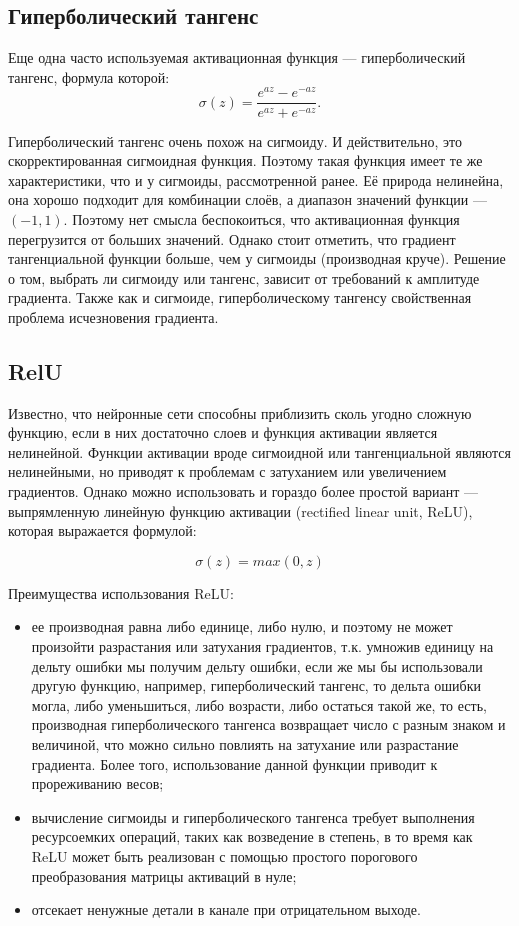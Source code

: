 \documentclass[11pt,colorlinks=true]{article}
\begin{document}
\subsection{Гиперболический тангенс}

Еще одна часто используемая активационная функция — гиперболический тангенс, формула которой:  
\begin{equation*}
\sigma(z) = \frac{e^{az} - e^{-az}}{e^{az} + e^{-az}}.
\end{equation*}

Гиперболический тангенс очень похож на сигмоиду. И действительно, это скорректированная сигмоидная функция. Поэтому такая функция имеет те же характеристики, что и у сигмоиды, рассмотренной ранее. Её природа нелинейна, она хорошо подходит для комбинации слоёв, а диапазон значений функции --- $(-1, 1)$. Поэтому нет смысла беспокоиться, что активационная функция перегрузится от больших значений. Однако стоит отметить, что градиент тангенциальной функции больше, чем у сигмоиды (производная круче). Решение о том, выбрать ли сигмоиду или тангенс, зависит от требований к амплитуде градиента. Также как и сигмоиде, гиперболическому тангенсу свойственная проблема исчезновения градиента.


\subsection{RelU}

Известно, что нейронные сети способны приблизить сколь угодно сложную функцию, если в них достаточно слоев и функция активации является нелинейной. Функции активации вроде сигмоидной или тангенциальной являются нелинейными, но приводят к проблемам с затуханием или увеличением градиентов. Однако можно использовать и гораздо более простой вариант — выпрямленную линейную функцию активации (rectified linear unit, ReLU), которая выражается формулой:  

\begin{equation*}
	\sigma(z) = max(0,z)
\end{equation*}

Преимущества использования ReLU:

\begin{itemize}
	\item ее производная равна либо единице, либо нулю, и поэтому не может произойти разрастания или затухания градиентов, т.к. умножив единицу на дельту ошибки мы получим дельту ошибки, если же мы бы использовали другую функцию, например, гиперболический тангенс, то дельта ошибки могла, либо уменьшиться, либо возрасти, либо остаться такой же, то есть, производная гиперболического тангенса возвращает число с разным знаком и величиной, что можно сильно повлиять на затухание или разрастание градиента. Более того, использование данной функции приводит к прореживанию весов;
	\item вычисление сигмоиды и гиперболического тангенса требует выполнения ресурсоемких операций, таких как возведение в степень, в то время как ReLU может быть реализован с помощью простого порогового преобразования матрицы активаций в нуле;
	\item отсекает ненужные детали в канале при отрицательном выходе.
\end{itemize}
\end{document}
